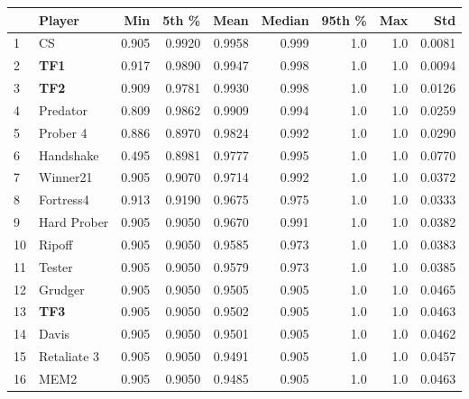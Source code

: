 \begin{tabular}{llrrrrrrr}
\toprule
{} &       Player &    Min &   5th \% &    Mean &  Median &  95th \% &  Max &     Std \\
\midrule
1  &           CS &  0.905 &  0.9920 &  0.9958 &   0.999 &     1.0 &  1.0 &  0.0081 \\
2  &          \textbf{TF1} &  0.917 &  0.9890 &  0.9947 &   0.998 &     1.0 &  1.0 &  0.0094 \\
3  &          \textbf{TF2} &  0.909 &  0.9781 &  0.9930 &   0.998 &     1.0 &  1.0 &  0.0126 \\
4  &     Predator &  0.809 &  0.9862 &  0.9909 &   0.994 &     1.0 &  1.0 &  0.0259 \\
5  &     Prober 4 &  0.886 &  0.8970 &  0.9824 &   0.992 &     1.0 &  1.0 &  0.0290 \\
6  &    Handshake &  0.495 &  0.8981 &  0.9777 &   0.995 &     1.0 &  1.0 &  0.0770 \\
7  &     Winner21 &  0.905 &  0.9070 &  0.9714 &   0.992 &     1.0 &  1.0 &  0.0372 \\
8  &    Fortress4 &  0.913 &  0.9190 &  0.9675 &   0.975 &     1.0 &  1.0 &  0.0333 \\
9  &  Hard Prober &  0.905 &  0.9050 &  0.9670 &   0.991 &     1.0 &  1.0 &  0.0382 \\
10 &       Ripoff &  0.905 &  0.9050 &  0.9585 &   0.973 &     1.0 &  1.0 &  0.0383 \\
11 &       Tester &  0.905 &  0.9050 &  0.9579 &   0.973 &     1.0 &  1.0 &  0.0385 \\
12 &      Grudger &  0.905 &  0.9050 &  0.9505 &   0.905 &     1.0 &  1.0 &  0.0465 \\
13 &          \textbf{TF3} &  0.905 &  0.9050 &  0.9502 &   0.905 &     1.0 &  1.0 &  0.0463 \\
14 &        Davis &  0.905 &  0.9050 &  0.9501 &   0.905 &     1.0 &  1.0 &  0.0462 \\
15 &  Retaliate 3 &  0.905 &  0.9050 &  0.9491 &   0.905 &     1.0 &  1.0 &  0.0457 \\
16 &         MEM2 &  0.905 &  0.9050 &  0.9485 &   0.905 &     1.0 &  1.0 &  0.0463 \\
\bottomrule
\end{tabular}
